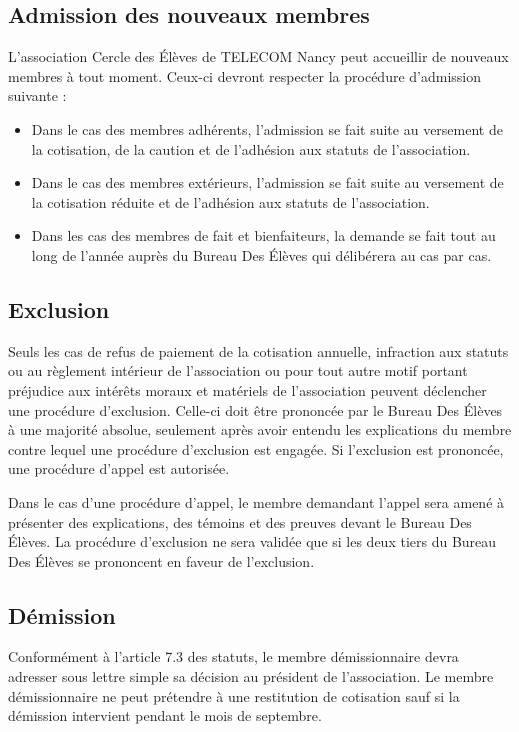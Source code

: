 \documentclass{article} %
\begin{document}
		\subsection{Admission des nouveaux membres}
			
			L’association Cercle des Élèves de TELECOM Nancy peut accueillir de
			nouveaux membres à tout moment. Ceux-ci devront respecter la
			procédure d’admission suivante :
			\begin{itemize}
				\item Dans le cas des membres adhérents, l’admission se fait
					suite au versement de la cotisation, de la caution et de
					l’adhésion aux statuts de l’association.
				\item Dans le cas des membres extérieurs, l’admission se fait
					suite au versement de la cotisation réduite et de l’adhésion
					aux statuts de l’association.
				\item Dans les cas des membres de fait et bienfaiteurs, la
					demande se fait tout au long de l’année auprès du Bureau Des
					Élèves qui délibérera au cas par cas.
			\end{itemize}

		\subsection{Exclusion}
			
			Seuls les cas de refus de paiement de la cotisation annuelle,
			infraction aux statuts ou au règlement intérieur de l'association ou
			pour tout autre motif portant préjudice aux intérêts moraux et
			matériels de l’association peuvent déclencher une procédure
			d’exclusion. Celle-ci doit être prononcée par le Bureau Des Élèves à
			une majorité absolue, seulement après avoir entendu les explications
			du membre contre lequel une procédure d’exclusion est engagée. Si
			l’exclusion est prononcée, une procédure d’appel est autorisée.

			Dans le cas d’une procédure d’appel, le membre demandant l’appel
			sera amené à présenter des explications, des témoins et des preuves
			devant le Bureau Des Élèves. La procédure d’exclusion ne sera
			validée que si les deux tiers du Bureau Des Élèves se prononcent en
			faveur de l’exclusion.

		\subsection{Démission}

			Conformément à l'article 7.3 des statuts, le membre démissionnaire
			devra adresser sous lettre simple sa décision au président de
			l’association. Le membre démissionnaire ne peut prétendre à une
			restitution de cotisation sauf si la démission intervient pendant le
			mois de septembre.
\end{document}

